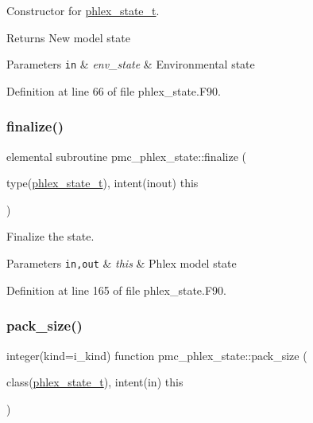 Constructor for \mbox{\hyperlink{structpmc__phlex__state_1_1phlex__state__t}{phlex\+\_\+state\+\_\+t}}. 

\begin{DoxyReturn}{Returns}
New model state
\end{DoxyReturn}

\begin{DoxyParams}[1]{Parameters}
\mbox{\tt in}  & {\em env\+\_\+state} & Environmental state \\
\hline
\end{DoxyParams}


Definition at line 66 of file phlex\+\_\+state.\+F90.

\mbox{\label{namespacepmc__phlex__state_abf02a2ecb17713c79ca09e71abbb7c07}} 
\subsubsection{\texorpdfstring{finalize()}{finalize()}}
{\footnotesize\ttfamily elemental subroutine pmc\+\_\+phlex\+\_\+state\+::finalize (\begin{DoxyParamCaption}\item[{type(\mbox{\hyperlink{structpmc__phlex__state_1_1phlex__state__t}{phlex\+\_\+state\+\_\+t}}), intent(inout)}]{this }\end{DoxyParamCaption})\hspace{0.3cm}{\ttfamily [private]}}



Finalize the state. 


\begin{DoxyParams}[1]{Parameters}
\mbox{\tt in,out}  & {\em this} & Phlex model state \\
\hline
\end{DoxyParams}


Definition at line 165 of file phlex\+\_\+state.\+F90.

\mbox{\label{namespacepmc__phlex__state_a58739e1d06ecd1cfe62aa5463602dacd}} 
\subsubsection{\texorpdfstring{pack\+\_\+size()}{pack\_size()}}
{\footnotesize\ttfamily integer(kind=i\+\_\+kind) function pmc\+\_\+phlex\+\_\+state\+::pack\+\_\+size (\begin{DoxyParamCaption}\item[{class(\mbox{\hyperlink{structpmc__phlex__state_1_1phlex__state__t}{phlex\+\_\+state\+\_\+t}}), intent(in)}]{this }\end{DoxyParamCaption})\hspace{0.3cm}{\ttfamily [private]}}



